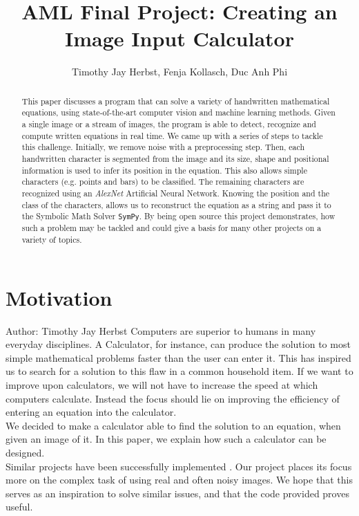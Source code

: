 \documentclass[12pt]{article}
\title{AML Final Project: Creating an Image Input Calculator} %
\author{Timothy Jay Herbst, Fenja Kollasch, Duc Anh Phi}
\begin{document}
	\maketitle
	
	\begin{abstract}
		This paper discusses a program that can solve a variety of handwritten mathematical equations, using state-of-the-art computer vision and machine learning methods.
		Given a single image or a stream of images, the program is able to detect, recognize and compute written equations in real time.
		We came up with a series of steps to tackle this challenge.
		Initially, we remove noise with a preprocessing step.
		Then, each handwritten character is segmented from the image and its size, shape and positional information is used to infer its position in the equation.
		This also allows simple characters (e.g. points and bars) to be classified.
		The remaining characters are recognized using an \textit{AlexNet} Artificial Neural Network.
		Knowing the position and the class of the characters, allows us to reconstruct the equation as a string and pass it to the Symbolic Math Solver \texttt{SymPy}.
		By being open source this project demonstrates, how such a problem may be tackled and could give a basis for many other projects on a variety of topics.
		
		
		
	\end{abstract}
	\newpage
	
	\tableofcontents
	
	\newpage
	\section{Motivation}
	\small{Author: Timothy Jay Herbst} \newline \newline
	Computers are superior to humans in many everyday disciplines.
	A Calculator, for instance, can produce the solution to most simple mathematical problems faster than the user can enter it.
	This has inspired us to search for a solution to this flaw in a common household item.
	If we want to improve upon calculators, we will not have to increase the speed at which computers calculate.
	Instead the focus should lie on improving the efficiency of entering an equation into the calculator.\\
	We decided to make a calculator able to find the solution to an equation, when given an image of it.
	In this paper, we explain how such a calculator can be designed.\\ Similar projects have been successfully implemented \cite{inspired-blog}. Our project places its focus more on the complex task of using real and often noisy images.
	We hope that this serves as an inspiration to solve similar issues, and that the code provided proves useful.
	
\end{document}
